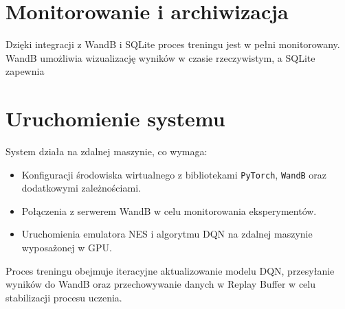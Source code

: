 \section{Monitorowanie i archiwizacja}

Dzięki integracji z WandB i SQLite proces treningu jest w pełni monitorowany. WandB umożliwia wizualizację wyników w czasie rzeczywistym, a SQLite zapewnia
\section{Uruchomienie systemu}

System działa na zdalnej maszynie, co wymaga:
\begin{itemize}
	\item Konfiguracji środowiska wirtualnego z bibliotekami \texttt{PyTorch}, \texttt{WandB} oraz dodatkowymi zależnościami.
	\item Połączenia z serwerem WandB w celu monitorowania eksperymentów.
	\item Uruchomienia emulatora NES i algorytmu DQN na zdalnej maszynie wyposażonej w GPU.
\end{itemize}

Proces treningu obejmuje iteracyjne aktualizowanie modelu DQN, przesyłanie wyników do WandB oraz przechowywanie danych w Replay Buffer w celu stabilizacji procesu uczenia.
